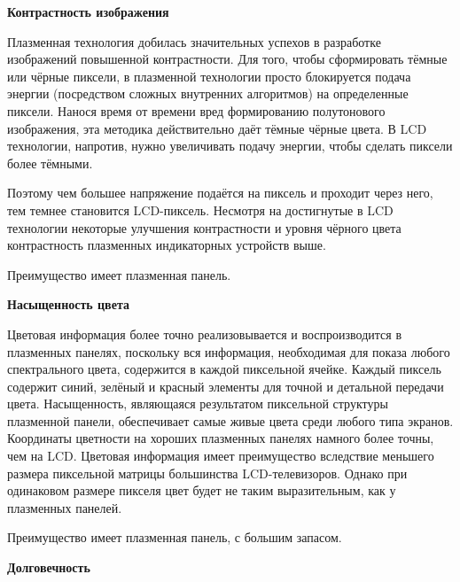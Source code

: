 
\begin{flushleft}
\textbf{Контрастность изображения}
\end{flushleft}

Плазменная технология добилась значительных успехов в разработке изображений повышенной контрастности. Для того, чтобы сформировать тёмные или чёрные пиксели, в плазменной технологии просто блокируется подача энергии (посредством сложных внутренних алгоритмов) на определенные пиксели. Нанося время от времени вред формированию полутонового изображения, эта методика действительно даёт тёмные чёрные цвета. В LCD технологии, напротив, нужно увеличивать подачу энергии, чтобы сделать пиксели более тёмными. 

Поэтому чем большее напряжение подаётся на пиксель и проходит через него, тем темнее становится LCD-пиксель. Несмотря на достигнутые в LCD технологии некоторые улучшения контрастности и уровня чёрного цвета контрастность плазменных индикаторных устройств выше. 

Преимущество имеет плазменная панель. 

\begin{flushleft}
\textbf{Насыщенность цвета}
\end{flushleft}

Цветовая информация более точно реализовывается и воспроизводится в плазменных панелях, поскольку вся информация, необходимая для показа любого спектрального цвета, содержится в каждой пиксельной ячейке. Каждый пиксель содержит синий, зелёный и красный элементы для точной и детальной передачи цвета. Насыщенность, являющаяся результатом пиксельной структуры плазменной панели, обеспечивает самые живые цвета среди любого типа экранов. Координаты цветности на хороших плазменных панелях намного более точны, чем на LCD. Цветовая информация имеет преимущество вследствие меньшего размера пиксельной матрицы большинства LCD-телевизоров. Однако при одинаковом размере пикселя цвет будет не таким выразительным, как у плазменных панелей.

Преимущество имеет плазменная панель, с большим запасом. 

\begin{flushleft}
\textbf{Долговечность}
\end{flushleft}


